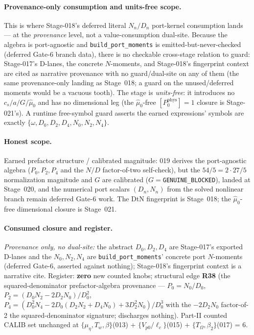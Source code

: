 \paragraph{Provenance-only consumption and units-free scope.}
This is where Stage-018's deferred literal \(N_n/D_n\) port-kernel consumption lands --- at
the \emph{provenance} level, not a value-consumption dual-site. Because the algebra is
port-agnostic and \texttt{build\_port\_moments} is emitted-but-never-checked (deferred Gate-6
branch data), there is no checkable cross-stage relation to guard: Stage-017's D-lanes, the
concrete \(N\)-moments, and Stage-018's fingerprint context are cited as narrative provenance
with no guard/dual-site on any of them (the same provenance-only landing as Stage~018; a
guard on the unused/deferred moments would be a vacuous tooth). The stage is \emph{units-free}:
it introduces no \(c_s/a/G/\hat\mu_0\) and has no dimensional leg (the \(\hat\mu_0\)-free
\([P_0^{\mathrm{phys}}]=1\) closure is Stage-021's). A runtime free-symbol guard asserts the
earned expressions' symbols are exactly \(\{\omega,D_0,D_2,D_4,N_0,N_2,N_4\}\).

\paragraph{Honest scope.}
Earned prefactor structure / calibrated magnitude: 019 derives the port-agnostic algebra
(\(P_0,P_2,P_4\) and the \(N/D\) factor-of-two self-check), but the \(54/5=2\cdot27/5\)
normalization magnitude and \(G\) are calibrated (\(G=\)\texttt{GENUINE\_BLOCKED}), landed at
Stage~020, and the numerical port scalars \((D_n,N_n)\) from the solved nonlinear branch
remain deferred Gate-6 work. The DtN fingerprint is Stage~018; the \(\hat\mu_0\)-free
dimensional closure is Stage~021.

\paragraph{Consumed closure and register.}
\emph{Provenance only, no dual-site:} the abstract \(D_0,D_2,D_4\) are Stage-017's exported
D-lanes and the \(N_0,N_2,N_4\) are \texttt{build\_port\_moments}' concrete port \(N\)-moments
(deferred Gate-6, asserted against nothing); Stage-018's fingerprint context is a narrative
cite. Register: \textbf{zero} new counted knobs; structural edge \textbf{R38} (the
squared-denominator prefactor-algebra provenance --- \(P_0=N_0/D_0\),
\(P_2=(D_0N_2-2D_2N_0)/D_0^2\), \(P_4=(D_0^2N_4-2D_0(D_2N_2+D_4N_0)+3D_2^2N_0)/D_0^3\) with the
\(-2D_2N_0\) factor-of-2 the squared-denominator signature; discharges nothing). Part-II
counted CALIB set unchanged at \(\{\mu_\eta,T_w,\beta\}\)(013) + \(\{V_{p0}/\ell_c\}\)(015) +
\(\{T_\Omega,\beta_2\}\)(017) = 6.

